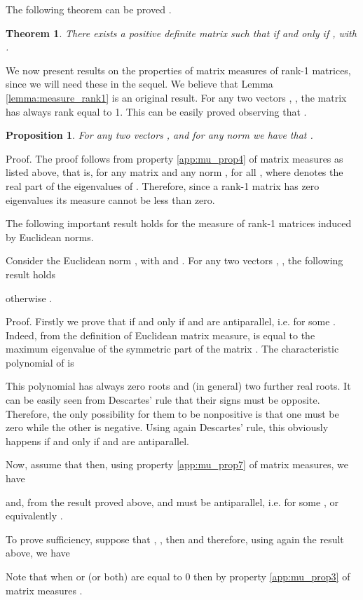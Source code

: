 \documentclass[twocolumn]{autart}
\newtheorem{theorem}{Theorem}
\newtheorem{proposition}{Proposition}
\begin{document}
The following theorem can be proved \citep{vidyasagar1978matrix,aminzare2014contraction}.
\begin{theorem}
\label{app:thm:weighted_mu}
There exists a positive definite matrix  such that  if and only if , with .
\end{theorem}
We now present results on the properties of matrix measures of rank-1 matrices, since we will need these in the sequel. We believe that Lemma \ref{lemma:measure_rank1} is an original result. For any two vectors , , the matrix  has always rank equal to 1. This can be easily proved observing that .
\begin{proposition}
For any two vectors ,  and for any norm we have that .
\end{proposition}
\begin{pf*}{Proof.}
The proof follows from property \ref{app:mu_prop4} of matrix measures as listed above, that is, for any matrix and any norm , for all , where  denotes the real part of the eigenvalues  of . Therefore, since a rank-1 matrix has  zero eigenvalues its measure cannot be less than zero.
\end{pf*}
The following important result holds for the measure of rank-1 matrices induced by Euclidean norms.
\begin{lem}
\label{lemma:measure_rank1}
Consider the Euclidean norm , with  and . For any two vectors , , the following result holds

otherwise .
\end{lem}
\begin{pf*}{Proof.}
Firstly we prove that  if and only if  and  are antiparallel, i.e.  for some . Indeed, from the definition of Euclidean matrix measure,  is equal to the maximum eigenvalue of the symmetric part  of the matrix .  The characteristic polynomial  of  is \citep[Fact 4.9.16]{bernstein2009matrix}

This polynomial has always  zero roots and (in general) two further real roots. It can be easily seen from Descartes' rule that their signs must be opposite. Therefore, the only possibility for them to be nonpositive is that one must be zero while the other is negative. Using again Descartes' rule, this obviously happens if and only if  and  are antiparallel.


Now, assume that  then, using property \ref{app:mu_prop7} of matrix measures, we have

and, from the result proved above,  and  must be antiparallel, i.e.  for some , or equivalently .

To prove sufficiency, suppose that , , then  and therefore, using again the result above, we have

\end{pf*}
Note that when  or  (or both) are equal to 0 then by property \ref{app:mu_prop3} of matrix measures .
\end{document}
